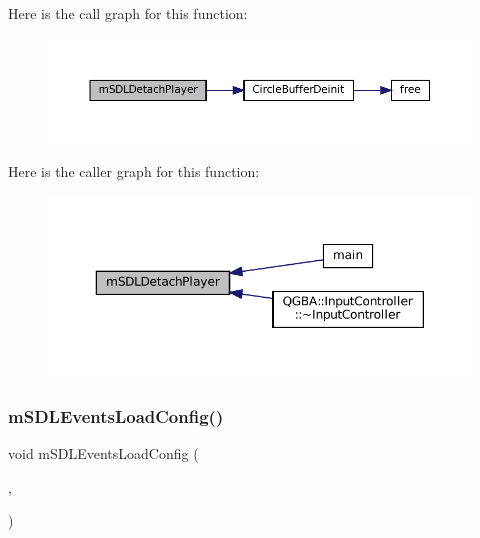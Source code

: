 Here is the call graph for this function\+:
\nopagebreak
\begin{figure}[H]
\begin{center}
\leavevmode
\includegraphics[width=350pt]{sdl-events_8h_a14ff9c1218058211b6b5ddf4e8793dc3_cgraph}
\end{center}
\end{figure}
Here is the caller graph for this function\+:
\nopagebreak
\begin{figure}[H]
\begin{center}
\leavevmode
\includegraphics[width=350pt]{sdl-events_8h_a14ff9c1218058211b6b5ddf4e8793dc3_icgraph}
\end{center}
\end{figure}
\mbox{\label{sdl-events_8h_a3c3efdcde7fe2309c3858a37ad72c0b3}} 
\subsubsection{\texorpdfstring{m\+S\+D\+L\+Events\+Load\+Config()}{mSDLEventsLoadConfig()}}
{\footnotesize\ttfamily void m\+S\+D\+L\+Events\+Load\+Config (\begin{DoxyParamCaption}\item[{struct \mbox{\hyperlink{sdl-events_8h_structm_s_d_l_events}{m\+S\+D\+L\+Events}} $\ast$}]{,  }\item[{const struct Configuration $\ast$}]{ }\end{DoxyParamCaption})}

